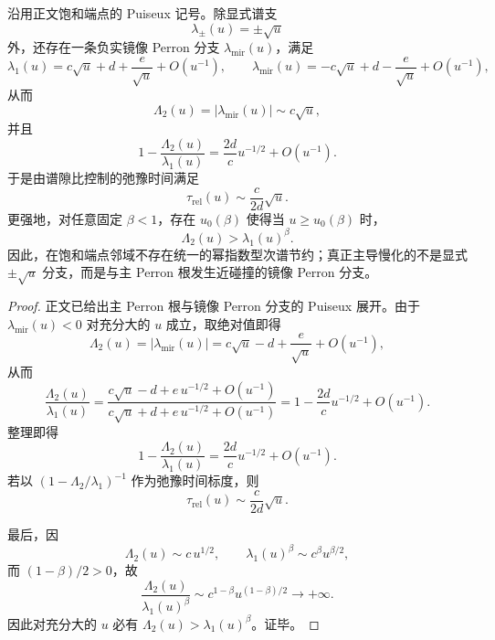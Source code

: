 \begin{theorem}\label{thm:conclusion-realinput40-mirror-perron-sqrt-slowdown}
沿用正文饱和端点的 Puiseux 记号。除显式谱支
\[
\lambda_\pm(u)=\pm\sqrt u
\]
外，还存在一条负实镜像 Perron 分支 \(\lambda_{\mathrm{mir}}(u)\)，满足
\[
\lambda_1(u)=c\sqrt u+d+\frac{e}{\sqrt u}+O(u^{-1}),
\qquad
\lambda_{\mathrm{mir}}(u)=-c\sqrt u+d-\frac{e}{\sqrt u}+O(u^{-1}),
\]
从而
\[
\Lambda_2(u)=|\lambda_{\mathrm{mir}}(u)|\sim c\sqrt u,
\]
并且
\[
\boxed{\;
1-\frac{\Lambda_2(u)}{\lambda_1(u)}
=
\frac{2d}{c}u^{-1/2}+O(u^{-1}).\;}
\]
于是由谱隙比控制的弛豫时间满足
\[
\boxed{\;\tau_{\mathrm{rel}}(u)\sim \frac{c}{2d}\sqrt u.\;}
\]
更强地，对任意固定 \(\beta<1\)，存在 \(u_0(\beta)\) 使得当 \(u\ge u_0(\beta)\) 时，
\[
\Lambda_2(u)>\lambda_1(u)^\beta.
\]
因此，在饱和端点邻域不存在统一的幂指数型次谱节约；真正主导慢化的不是显式 \(\pm\sqrt u\) 分支，而是与主 Perron 根发生近碰撞的镜像 Perron 分支。
\end{theorem}
\begin{proof}
正文已给出主 Perron 根与镜像 Perron 分支的 Puiseux 展开。由于 \(\lambda_{\mathrm{mir}}(u)<0\) 对充分大的 \(u\) 成立，取绝对值即得
\[
\Lambda_2(u)=|\lambda_{\mathrm{mir}}(u)|=c\sqrt u-d+\frac{e}{\sqrt u}+O(u^{-1}),
\]
从而
\[
\frac{\Lambda_2(u)}{\lambda_1(u)}
=
\frac{c\sqrt u-d+e\,u^{-1/2}+O(u^{-1})}{c\sqrt u+d+e\,u^{-1/2}+O(u^{-1})}
=
1-\frac{2d}{c}u^{-1/2}+O(u^{-1}).
\]
整理即得
\[
1-\frac{\Lambda_2(u)}{\lambda_1(u)}
=
\frac{2d}{c}u^{-1/2}+O(u^{-1}).
\]
若以 \((1-\Lambda_2/\lambda_1)^{-1}\) 作为弛豫时间标度，则
\[
\tau_{\mathrm{rel}}(u)\sim \frac{c}{2d}\sqrt u.
\]

最后，因
\[
\Lambda_2(u)\sim c\,u^{1/2},
\qquad
\lambda_1(u)^\beta\sim c^\beta u^{\beta/2},
\]
而 \((1-\beta)/2>0\)，故
\[
\frac{\Lambda_2(u)}{\lambda_1(u)^\beta}\sim c^{1-\beta}u^{(1-\beta)/2}\to+\infty.
\]
因此对充分大的 \(u\) 必有 \(\Lambda_2(u)>\lambda_1(u)^\beta\)。证毕。
\end{proof}
